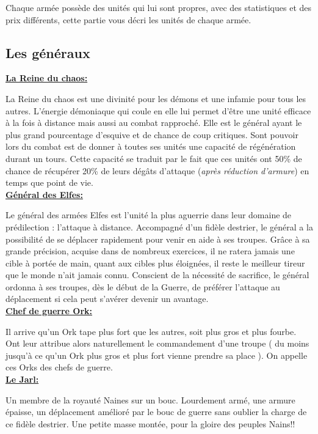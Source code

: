 \documentclass[a4paper]{article}
\begin{document}
	\quad Chaque armée possède des unités qui lui sont propres, avec des statistiques et des prix différents, cette partie vous décri les unités de chaque armée.

\subsection{Les généraux}

	\quad\underline{\textbf{La Reine du chaos: }}
	
	\quad La Reine du chaos est une divinité pour les démons et une infamie pour tous les autres. L'énergie démoniaque qui coule en elle lui permet d'être une unité efficace à la fois à distance mais aussi au combat rapproché. Elle est le général ayant le plus grand pourcentage d'esquive et de chance de coup critiques. Sont pouvoir lors du combat est de donner à toutes ses unités une capacité de régénération durant un tours. Cette capacité se traduit par le fait que ces unités ont 50\% de chance de récupérer 20\% de leurs dégâts d'attaque (\textit{après réduction d'armure}) en temps que point de vie. \\
	
	 \quad\underline{\textbf{Général des Elfes:} }
    
 	\quad Le général des armées Elfes est l'unité la plus aguerrie dans leur domaine de prédilection : l'attaque à distance. Accompagné d'un fidèle destrier, le général a la possibilité de se déplacer rapidement pour venir en aide à ses troupes. Grâce à sa grande précision, acquise dans de nombreux exercices, il ne ratera jamais une cible à portée de main, quant aux cibles plus éloignées, il reste le meilleur tireur que le monde n'ait jamais connu. Conscient de la nécessité de sacrifice, le général ordonna à ses troupes, dès le début de la Guerre, de préférer l'attaque au déplacement si cela peut s'avérer devenir un avantage.\\
 	
 	\quad\underline{\textbf{Chef de guerre Ork: }}
	
	\quad Il arrive qu'un Ork tape plus fort que les autres, soit plus gros et plus fourbe. Ont leur attribue alors naturellement le commandement d'une troupe ( du moins jusqu'à ce qu'un Ork plus gros et plus fort vienne prendre sa place ). On appelle ces Orks des chefs de guerre.\\
	
	\quad\underline{\textbf{Le Jarl:} }
	
	\quad Un membre de la royauté Naines sur un bouc. Lourdement armé, une armure épaisse, un déplacement amélioré par le bouc de guerre sans oublier la charge de ce fidèle destrier. Une petite masse montée, pour la gloire des peuples Nains!!
	
\end{document}
